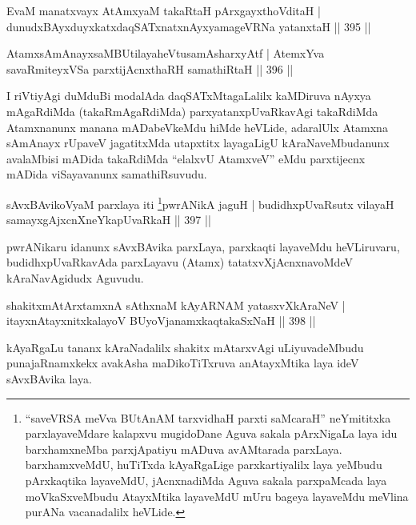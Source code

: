 
\begin{shl}
EvaM manatxvayx AtAmx\s yaM takaRtaH pArxgayxthoVditaH |
dunudxBAyxduyxkatxdaqSATxnatxnAyxyamageVRNa yatanxtaH \hfill || 395 ||
\end{shl}
\begin{shl}
AtamxsAmAnayxsaMBUtilayaheVtusamAsharxyAtf |
AtemxYva savaRmiteyxVSa parxtijAcnxthaRH samathiRtaH \hfill || 396 ||
\end{shl}

\begin{artha}
I riVtiyAgi duMduBi modalAda daqSATxMtagaLalilx kaMDiruva nAyxya mAgaRdiMda (takaRmAgaRdiMda) parxyatanxpUvaRkavAgi takaRdiMda Atamxnanunx manana mADabeVkeMdu hiMde heVLide, adaralUlx Atamxna sAmAnayx rUpaveV jagatitxMda utapxtitx layagaLigU kAraNaveMbudanunx avalaMbisi mADida takaRdiMda ``elalxvU AtamxveV'' eMdu parxtijecnx mADida viSayavanunx samathiRsuvudu.
\end{artha}

\begin{shl}
sAvxBAvikoV\s yaM parxlaya iti \footnote{``saveVRSA meVva BUtAnAM tarxvidhaH parxti saMcaraH'' neYmititxka parxlayaveMdare kalapxvu mugidoDane Aguva sakala pArxNigaLa laya idu barxhamxneMba parxjApatiyu mADuva avAMtarada parxLaya. barxhamxveMdU, huTiTxda kAyaRgaLige parxkartiyalilx laya yeMbudu pArxkaqtika layaveMdU, jAcnxnadiMda Aguva sakala parxpaMcada laya moVkaSxveMbudu AtayxMtika layaveMdU mUru bageya layaveMdu meVlina purANa vacanadalilx heVLide.}pwrANikA jaguH |
budidhxpUvaRsutx vilayaH samayxgAjxcnXneYkapUvaRkaH \hfill || 397 ||
\end{shl}

\begin{artha}
pwrANikaru idanunx sAvxBAvika parxLaya, parxkaqti layaveMdu heVLiruvaru, budidhxpUvaRkavAda parxLayavu (Atamx) tatatxvXjAcnxnavoMdeV kAraNavAgidudx Aguvudu.
\end{artha}


\begin{shl}
shakitxmAtArxtamxnA sAthxnaM kAyARNAM yatasxvXkAraNeV |
itayxnAtayxnitxkalayoV BUyoVjanamxkaqtakaSxNaH \hfill || 398 ||
\end{shl}

\begin{artha}
kAyaRgaLu tananx kAraNadalilx shakitx mAtarxvAgi uLiyuvadeMbudu punajaRnamxkekx avakAsha maDikoTiTxruva anAtayxMtika laya ideV sAvxBAvika laya.
\end{artha}

